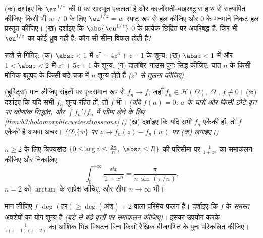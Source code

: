 \begin{exercise}[$\star\star$]\label{exo:b3:residues:6}
(क) दर्शाइए कि $\eu^{1/z}$ की $0$ पर सारभूत एकलता है और
काज़ोराती--वाइरश्ट्रास हाथ से सत्यापित कीजिए: किसी भी $w \neq 0$ के लिए
$\eu^{1/z} =
w$ स्पष्ट रूप से हल कीजिए और $0$ के मनमाने निकट हल प्रस्तुत
कीजिए।
(ख) दर्शाइए कि $\abs{\eu^{1/z}}$ $0$ के प्रत्येक छिद्रित  पर
अपरिबद्ध है, फिर भी $\eu^{1/z}$ का कोई ध्रुव नहीं है: कौन-सी सीमा विफल
होती है?
\end{exercise}

\begin{exercise}[$\star\star$]\label{exo:b3:residues:7}
रूशे से गिनिए:
(क) $\abs z < 1$ में $z^7 - 4z^3 + z - 1$ के शून्य;
(ख) $\abs z < 1$ में और $1 <
\abs z < 2$ में $z^4 + 5z + 1$ के शून्य;
(ग) दालांबेर--गाउस पुनः सिद्ध कीजिए: घात $n$ के किसी मोनिक
बहुपद के किसी बड़े चक्र में $n$ शून्य होते हैं \emph{($z^n$ से
तुलना कीजिए)}।
\end{exercise}

\begin{exercise}[$\star\star\star$]\label{exo:b3:residues:8}
(हुर्विट्स) मान लीजिए संहतों पर एकसमान रूप से $f_n \to f$, जहाँ $f_n \in
\mathcal H(\Omega)$,
$\Omega$ , $f \not\equiv 0$।
(क) दर्शाइए कि यदि सभी $f_n$ शून्य-रहित हों, तो $f$ भी।
\emph{(यदि $f(a) = 0$: $a$ के चारों ओर किसी छोटे वृत्त पर कोणांक
सिद्धांत, और $\int f_n'/f_n$ में सीमा लेने के लिए \cref{thm:b3:holomorphic:weierstrassconv}।)}
(ख) दर्शाइए कि यदि सभी $f_n$ एकैकी हों, तो $f$ एकैकी है अथवा
अचर। \emph{($\Omega\setminus\{w\}$ पर $z \mapsto f_n(z) - f_n(w)$ पर (क) लगाइए।)}
\end{exercise}

\begin{exercise}[$\star\star\star$]\label{exo:b3:residues:9}
$n \geq 2$ के लिए त्रिज्यखंड $\{0 \leq \arg z \leq \frac{2\pi}n,\ \abs z
\leq R\}$ की परिसीमा पर $\frac1{1 + z^n}$ का समाकलन कीजिए
और निकालिए
\[
\int_0^{+\infty}\frac{\dd x}{1 + x^n} =
\frac{\pi}{n\,\sin(\pi/n)} .
\]
$n = 2$ को $\arctan$ के सापेक्ष जाँचिए, और सीमा $n \to
\infty$ भी।
\end{exercise}

\begin{exercise}[$\star\star$]\label{exo:b3:residues:10}
मान लीजिए $f$ $\deg(\text{हर})
\geq \deg(\text{अंश}) + 2$ वाला परिमेय फलन है। दर्शाइए कि $f$ के
\emph{समस्त} अवशेषों का योग शून्य है \emph{(बड़े से बड़े वृत्तों
पर समाकलन कीजिए)}। इसका उपयोग करके $\frac1{z(z-1)(z-2)}$ का आंशिक भिन्न विघटन बिना
किसी रैखिक बीजगणित के पुनः परिकलित कीजिए।
\end{exercise}

